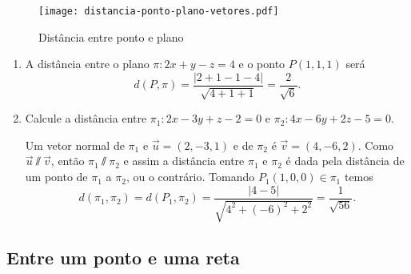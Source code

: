 \begin{figure}[!h]
    \centering
    \caption{Dist\^ancia entre ponto e plano}
    \texttt{[image: distancia-ponto-plano-vetores.pdf]}
\end{figure}

\newpage
\begin{exemplos}
    \begin{enumerate}
        \item A dist\^ancia entre o plano $\pi: 2x + y - z = 4$ e o ponto $P(1,1,1)$ ser\'a
        \[
            d(P,\pi) = \dfrac{|2 + 1 - 1 - 4|}{\sqrt{4 + 1 + 1}} = \dfrac{2}{\sqrt{6}}.
        \]
        \item Calcule a dist\^ancia entre $\pi_1 : 2x - 3y + z - 2 = 0$ e $\pi_2 : 4x - 6y + 2z - 5 = 0$.
        \begin{solucao}
            Um vetor normal de $\pi_1$ e $\vec{u} = (2,-3,1)$ e de $\pi_2$ \'e $\vec{v} = (4,-6,2)$. Como $\vec{u}\varparallel\vec{v}$, ent\~ao $\pi_1\varparallel\pi_2$ e assim a dist\^ancia entre $\pi_1$ e $\pi_2$ \'e dada pela dist\^ancia de um ponto de $\pi_1$ a $\pi_2$, ou o contr\'ario. Tomando $P_1(1,0,0)\in\pi_1$ temos
            \[
                d(\pi_1,\pi_2) = d(P_1,\pi_2) = \dfrac{|4-5|}{\sqrt{4^2 + (-6)^2 + 2^2}} = \dfrac{1}{\sqrt{56}}.
            \]
        \end{solucao}
    \end{enumerate}
\end{exemplos}


\subsection{Entre um ponto e uma reta} %
\label{sub:entre_um_ponto_e_uma_reta}

